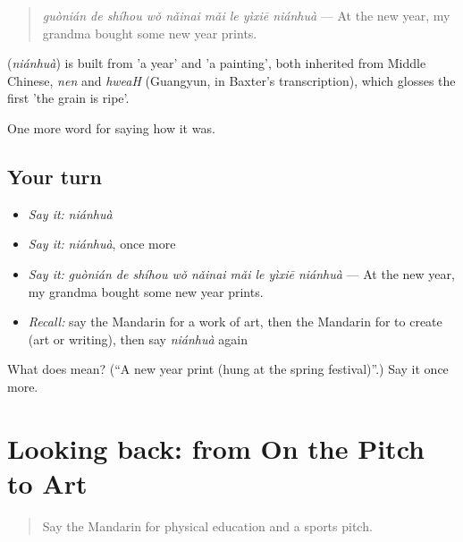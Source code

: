 \begin{quote}
\emph{guònián de shíhou wǒ nǎinai mǎi le yìxiē niánhuà} — At the new year, my grandma bought some new year prints.
\end{quote}

\begin{cousinweb}
\textbf{} (\emph{niánhuà}) is built from  'a year' and  'a painting', both inherited from Middle Chinese, \emph{nen} and \emph{hweaH} (Guangyun, in Baxter's transcription), which glosses the first 'the grain is ripe'.
\end{cousinweb}

\begin{grammarlens}[title={What you've built}]
One more word for saying how it was.
\end{grammarlens}

\subsection*{Your turn}
\begin{itemize}
\raggedright
  \item \emph{Say it:} \emph{niánhuà}
  \item \emph{Say it:} \emph{niánhuà}, once more
  \item \emph{Say it:} \emph{guònián de shíhou wǒ nǎinai mǎi le yìxiē niánhuà} — At the new year, my grandma bought some new year prints.
  \item \emph{Recall:} say the Mandarin for a work of art, then the Mandarin for to create (art or writing), then say \emph{niánhuà} again
\end{itemize}

\begin{tcolorbox}[breakable,colback=teal!4,colframe=teal!35!black,title={Before you move on}]
What does  mean? (\textquotedblleft{}A new year print (hung at the spring festival)\textquotedblright{}.) Say it once more.
\end{tcolorbox}
\section[(dialogue)]{Looking back: from On the Pitch to Art}

\label{lesson:ZH-R503-review-498-503}



\begin{quote}
Say the Mandarin for physical education and a sports pitch.
\end{quote}

